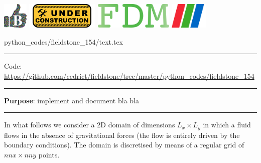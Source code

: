 \noindent
\includegraphics[height=1.25cm]{images/pictograms/benchmark}
\includegraphics[height=1.25cm]{images/pictograms/under_construction}
\includegraphics[height=1.25cm]{images/pictograms/FDM}
\includegraphics[height=1.25cm]{images/pictograms/paraview}


\begin{flushright} {\tiny {\color{gray} python\_codes/fieldstone\_154/text.tex}} \end{flushright}

%

\par\noindent\rule{\textwidth}{0.4pt}

\begin{center}
\inpython
{\small Code: \url{https://github.com/cedrict/fieldstone/tree/master/python_codes/fieldstone_154}}
\end{center}

\par\noindent\rule{\textwidth}{0.4pt}

{\bf \color{teal} Purpose}: implement and document bla bla 

\par\noindent\rule{\textwidth}{0.4pt}


In what follows we consider a 2D domain of dimensions $L_x \times L_y$ in which 
a fluid flows in the absence of gravitational forces (the flow is entirely driven by 
the boundary conditions). The domain is discretised by means of a regular grid 
of $nnx \times nny$ points. 

